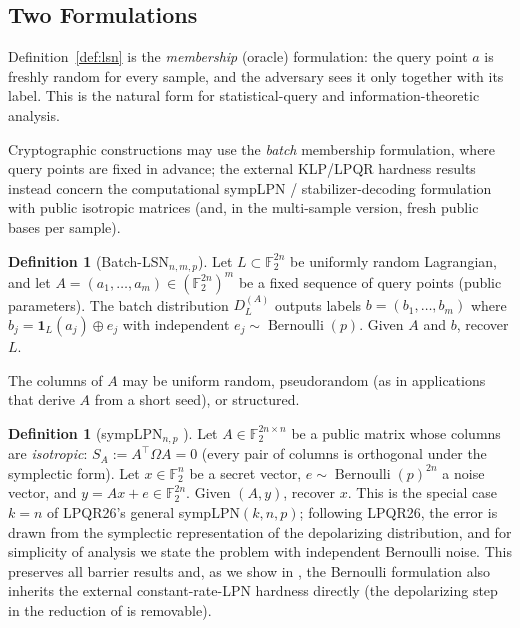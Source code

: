 \documentclass[11pt,a4paper]{article}
\theoremstyle{plain}
\theoremstyle{definition}
\newtheorem{definition}[theorem]{Definition}
\newcommand{\F}{\mathbb{F}}
\begin{document}
\subsection{Two Formulations}
\label{subsec:two-forms}

Definition~\ref{def:lsn} is the \emph{membership} (oracle) formulation: the query point $a$ is freshly random for every sample, and the adversary sees it only together with its label. This is the natural form for statistical-query and information-theoretic analysis.

Cryptographic constructions may use the \emph{batch} membership formulation, where query points are fixed in advance; the external KLP/LPQR hardness results instead concern the computational sympLPN / stabilizer-decoding formulation with public isotropic matrices (and, in the multi-sample version, fresh public bases per sample).

\begin{definition}[Batch-LSN$_{n,m,p}$]
\label{def:lsn-batch}
Let $L \subset \F_2^{2n}$ be uniformly random Lagrangian, and let $A = (a_1,\dots,a_m) \in (\F_2^{2n})^m$ be a fixed sequence of query points (public parameters). The batch distribution $D_L^{(A)}$ outputs labels $b = (b_1,\dots,b_m)$ where $b_j = \mathbf{1}_L(a_j) \oplus e_j$ with independent $e_j \sim \operatorname{Bernoulli}(p)$. Given $A$ and $b$, recover $L$.
\end{definition}

The columns of $A$ may be uniform random, pseudorandom (as in applications that derive $A$ from a short seed), or structured.

\begin{definition}[sympLPN$_{n,p}$ \cite{KLP+25,LPQR26}]
\label{def:symplpn}
Let $A \in \F_2^{2n \times n}$ be a public matrix whose columns are \emph{isotropic}: $S_A := A^{\top}\Omega A = 0$ (every pair of columns is orthogonal under the symplectic form). Let $x \in \F_2^n$ be a secret vector, $e \sim \operatorname{Bernoulli}(p)^{2n}$ a noise vector, and $y = Ax + e \in \F_2^{2n}$. Given $(A,y)$, recover $x$.
This is the special case $k=n$ of LPQR26's general sympLPN$(k,n,p)$; following LPQR26, the error is drawn from the symplectic representation of the depolarizing distribution, and for simplicity of analysis we state the problem with independent Bernoulli noise. This preserves all barrier results and, as we show in , the Bernoulli formulation also inherits the external constant-rate-LPN hardness directly (the depolarizing step in the reduction of \cite{KLP+25} is removable).
\end{definition}
\end{document}
